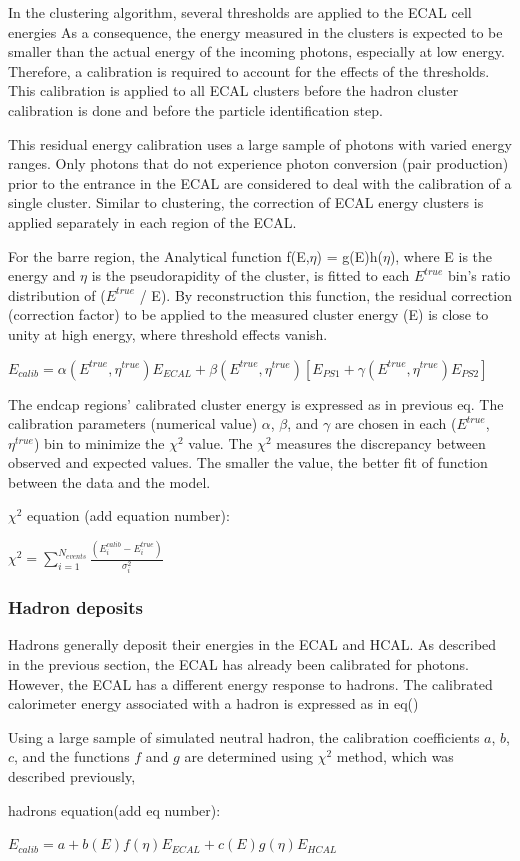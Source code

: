 In the clustering algorithm, several thresholds are applied to the ECAL cell energies %
As a consequence, the energy measured in the clusters is expected to be smaller than the actual energy of the incoming photons, especially at low energy.
Therefore, a calibration is required to account for the effects of the thresholds.
This calibration is applied to all ECAL clusters before the hadron cluster calibration is done and before the particle identification step.

This residual energy calibration uses a large sample of photons with varied energy ranges.
Only photons that do not experience photon conversion (pair production) prior to the entrance in the ECAL are considered to deal with the calibration of a single cluster.
Similar to clustering, the correction of ECAL energy clusters is applied separately in each region of the ECAL.

For the barre region, the Analytical function f(E,$\eta$) = g(E)h($\eta$), where E is the energy and $\eta$ is the pseudorapidity of the cluster, is fitted to each $E^{true}$ bin's ratio distribution of ($E^{true}$ / E).
By reconstruction this function, the residual correction (correction factor) to be applied to the measured cluster energy (E) is close to unity at high energy, where threshold effects vanish.

$E_{calib} = \alpha(E^{true},\eta^{true})E_{ECAL} + \beta(E^{true},\eta^{true})[E_{PS1}+\gamma(E^{true},\eta^{true})E_{PS2}]$

The endcap regions' calibrated cluster energy is expressed as in previous eq. The calibration parameters (numerical value) $\alpha$, $\beta$, and $\gamma$ are chosen in each ($E^{true}$,$\eta^{true}$) bin to minimize the $\chi^{2}$ value. The $\chi^{2}$ measures the discrepancy between observed and expected values. The smaller the value, the better fit of function between the data and the model.



$\chi^{2}$ equation (add equation number):

$\chi^2 = \sum_{i=1}^{N_{events}}\frac{(E_{i}^{calib} - E_{i}^{true})}{\sigma_{i}^{2}}$


\subsubsection{Hadron deposits}

Hadrons generally deposit their energies in the ECAL and HCAL.
As described in the previous section, the ECAL has already been calibrated for photons.
However, the ECAL has a different energy response to hadrons.
The calibrated calorimeter energy associated with a hadron is expressed as in eq()

Using a large sample of simulated neutral hadron, the calibration coefficients $a$, $b$, $c$, and the functions $f$ and $g$ are determined using $\chi^{2}$ method, which was described previously, 

hadrons equation(add eq number):

$E_{calib} = a + b(E)f(\eta)E_{ECAL} + c(E)g(\eta)E_{HCAL}$ %
